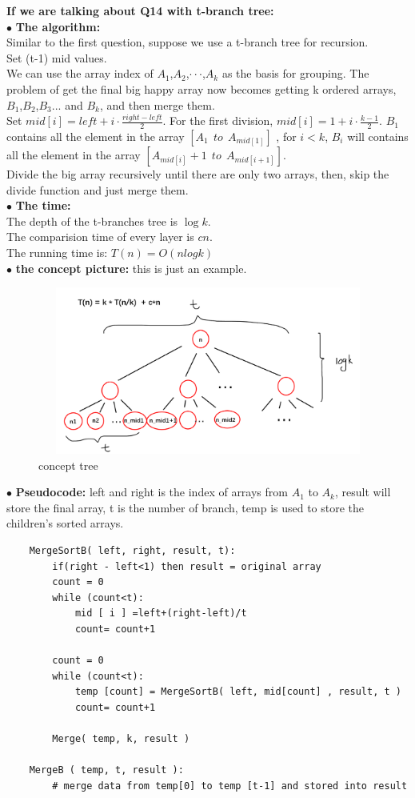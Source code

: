\documentclass[12pt,a4paper]{article}
\begin{document}
\noindent
\textbf{If we are talking about Q14 with t-branch tree:}\\
$\bullet$ \textbf{The algorithm:}\\
Similar to the first question, suppose we use a t-branch tree for recursion.\\
Set (t-1) mid values.\\
We can use the array index of $A_1$,$A_2$,$\cdot \cdot \cdot$,$A_k$ as the basis for grouping. The problem of get the final big happy array now becomes getting k ordered arrays, $B_1$,$B_2$,$B_3$... and $B_k$, and then merge them.\\
Set $mid[i] = left+i \cdot \frac{right-left}{2}$. For the first division, $mid[i] = 1+i \cdot \frac{k-1}{2}$. $B_1$ contains all the element in the array $[A_1 \ \ to \ \ A_{mid[1]}]$ , for $i<k$, $B_i$ will contains all the element in the array $[A_{mid[i]}+1 \ \ to \ \ A_{mid[i+1]}]$.\\
Divide the big array recursively until there are only two arrays, then, skip the divide function and just merge them.\\
$\bullet$ \textbf{The time:}\\
The depth of the t-branches tree is $\log{k}$.\\
The comparision time of every layer is $cn$.\\
The running time is: $T(n) =  O(nlogk)$\\
$\bullet$ \textbf{the concept picture:} this is just an example.
	\begin{figure}[H]
	\centering %
	\includegraphics[height=5.5cm,width=12.5cm]{picture//Q14B2.png}
	\caption{concept tree}
	\end{figure}
\noindent
$\bullet$ \textbf{Pseudocode:}
	left and right is the index of arrays from $A_1$ to $A_k$, result will store the final array, t is the number of branch, temp is used to store the children's sorted arrays.
	\begin{lstlisting}
	MergeSortB( left, right, result, t):
		if(right - left<1) then result = original array
		count = 0
		while (count<t):
			mid [ i ] =left+(right-left)/t
			count= count+1
		
		count = 0
		while (count<t):
			temp [count] = MergeSortB( left, mid[count] , result, t )
			count= count+1
	
		Merge( temp, k, result )
	
	MergeB ( temp, t, result ):
		# merge data from temp[0] to temp [t-1] and stored into result
	\end{lstlisting}
\end{document}
